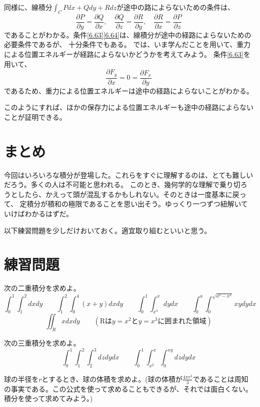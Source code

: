 \documentclass[a4j,dvipdfmx]{jsarticle}
\begin{document}
同様に、線積分$\displaystyle\int_C Pdx+Qdy+Rdz$が途中の路によらないための条件は、
\begin{equation}
    \frac{\partial P}{\partial y}=\frac{\partial Q}{\partial x},\quad\frac{\partial Q}{\partial z}=\frac{\partial R}{\partial y},\quad \frac{\partial R}{\partial x}=\frac{\partial P}{\partial z}\label{6.64}
\end{equation}
であることがわかる。条件\eqref{6.63}\eqref{6.64}は、線積分が途中の経路によらないための必要条件であるが、
十分条件でもある。
\newpage
では、いま学んだことを用いて、重力による位置エネルギーが経路によらないかどうかを考えてみよう。
条件\eqref{6.63}を用いて、
\begin{equation*}
    \frac{\partial F_y}{\partial x}=0=\frac{\partial F_x}{\partial y}
\end{equation*}
であるため、重力による位置エネルギーは途中の経路によらないことがわかる。

このようにすれば、ほかの保存力による位置エネルギーも途中の経路によらないことが証明できる。
\section{まとめ}
今回はいろいろな積分が登場した。これらをすぐに理解するのは、とても難しいだろう。多くの人は不可能と思われる。
このとき、幾何学的な理解で乗り切ろうとしたら、かえって頭が混乱するかもしれない。そのときは一度基本に戻って、
定積分が積和の極限であることを思い出そう。ゆっくり一つずつ紐解いていけばわかるはずだ。

以下練習問題を少しだけおいておく。適宜取り組むといいと思う。

\section{練習問題}
次の二重積分を求めよ。
\begin{equation*}
    \int_0^1\int_1^2dxdy\qquad\int_1^2\int_0^4(x+y)dxdy\qquad\int_0^1\int_{x^3}^xdydx\qquad\int_0^a\int_0^{\sqrt{a^2-x^2}}xydydx
\end{equation*}
\begin{equation*}
    \iint_R xdxdy\qquad(\text{Rは$y=x^2$と$y=x^3$に囲まれた領域})
\end{equation*}

次の三重積分を求めよ。
\begin{equation*}
    \int_0^1\int_1^2\int_2^3dzdydx\qquad\int_0^1\int_{x^2}^x\int_0^{xy}dzdydx
\end{equation*}

球の半径を$r$とするとき、球の体積を求めよ。(球の体積が$\frac{4\pi r^3}{3}$であることは周知の事実である。この公式を使って求めることもできるが、それでは面白くない。積分を使って求めてみよう。)\\
\end{document}
